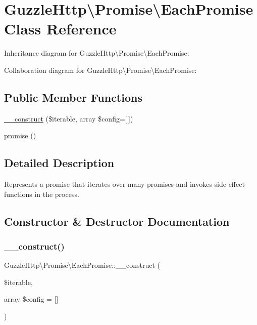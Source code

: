 \hypertarget{classGuzzleHttp_1_1Promise_1_1EachPromise}{}\section{Guzzle\+Http\textbackslash{}Promise\textbackslash{}Each\+Promise Class Reference}
\label{classGuzzleHttp_1_1Promise_1_1EachPromise}


Inheritance diagram for Guzzle\+Http\textbackslash{}Promise\textbackslash{}Each\+Promise\+:


Collaboration diagram for Guzzle\+Http\textbackslash{}Promise\textbackslash{}Each\+Promise\+:
\subsection*{Public Member Functions}
\begin{DoxyCompactItemize}
\item 
\hyperlink{classGuzzleHttp_1_1Promise_1_1EachPromise_a73650da153d2a2ce861ba905f6d564ee}{\+\_\+\+\_\+construct} (\$iterable, array \$config=\mbox{[}$\,$\mbox{]})
\item 
\hyperlink{classGuzzleHttp_1_1Promise_1_1EachPromise_ad1e93c51efc4d3159416f1b4ba47afbe}{promise} ()
\end{DoxyCompactItemize}


\subsection{Detailed Description}
Represents a promise that iterates over many promises and invokes side-\/effect functions in the process. 

\subsection{Constructor \& Destructor Documentation}
\mbox{\label{classGuzzleHttp_1_1Promise_1_1EachPromise_a73650da153d2a2ce861ba905f6d564ee}} 
\subsubsection{\texorpdfstring{\+\_\+\+\_\+construct()}{\_\_construct()}}
{\footnotesize\ttfamily Guzzle\+Http\textbackslash{}\+Promise\textbackslash{}\+Each\+Promise\+::\+\_\+\+\_\+construct (\begin{DoxyParamCaption}\item[{}]{\$iterable,  }\item[{array}]{\$config = {\ttfamily \mbox{[}\mbox{]}} }\end{DoxyParamCaption})}

